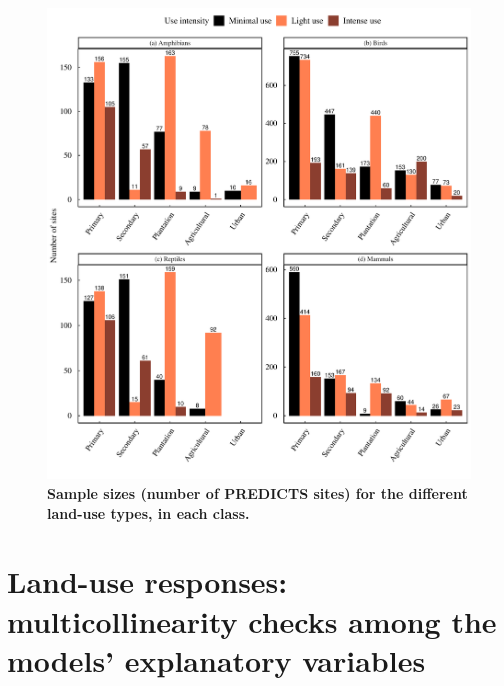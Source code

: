 \documentclass[11pt]{article}
\begin{document}
\begin{figure}[h!]
\centering
\includegraphics[scale=0.7]{Figures/Sample_size_figure}
\caption[Sample sizes (number of PREDICTS sites) for the different land-use types, in each class]{\textbf{Sample sizes (number of PREDICTS sites) for the different land-use types, in each class.}}
\label{SI_4_Figure4}
\end{figure}

\clearpage
\section{Land-use responses: multicollinearity checks among the models' explanatory variables}
\end{document}
